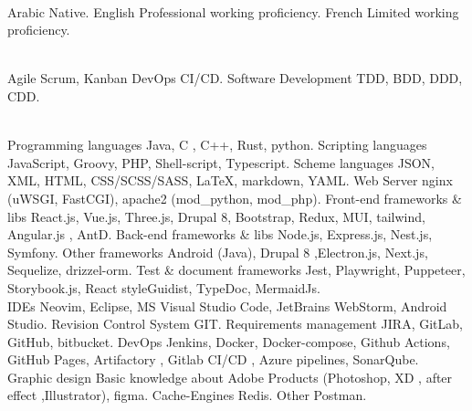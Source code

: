 


\begin{cvskills}
    \\
  \cvskill
    {Arabic}
    {Native.}
  \cvskill
    {English}
    {Professional working proficiency.}
  \cvskill
    {French}
    {Limited working proficiency.}


  \\

  \cvskill
    {Agile}
    {Scrum, Kanban}
  \cvskill
    {DevOps}
    {CI/CD.}
  \cvskill
    {Software Development}
    {TDD, BDD, DDD, CDD.}

  \\

  \cvskill
    {Programming languages}
    {Java, C , C++, Rust, python.}
  \cvskill
    {Scripting languages}
    {JavaScript, Groovy, PHP, Shell-script, Typescript.}
  \cvskill
    {Scheme languages}
    {JSON, XML, HTML, CSS/SCSS/SASS, LaTeX, markdown, YAML.}
  \cvskill
    {Web Server}
    {nginx (uWSGI, FastCGI), apache2 (mod\_python, mod\_php).}
  \cvskill
    {Front-end frameworks \& libs}
    {React.js, Vue.js, Three.js, Drupal 8, Bootstrap, Redux, MUI, tailwind, Angular.js , AntD.}
  \cvskill
    {Back-end frameworks \& libs}
    {Node.js, Express.js, Nest.js, Symfony.}
  \cvskill
    {Other frameworks}
    {Android (Java), Drupal 8 ,Electron.js, Next.js, Sequelize, drizzel-orm.}
  \cvskill
    {Test \& document frameworks}
    {Jest, Playwright, Puppeteer, Storybook.js, React styleGuidist, TypeDoc, MermaidJs.}
  \\

    \cvskill
      {IDEs}
      {Neovim, Eclipse, MS Visual Studio Code, JetBrains WebStorm, Android Studio.}
    \cvskill
      {Revision Control System}
      {GIT.}
    \cvskill
      {Requirements management}
      {JIRA, GitLab, GitHub, bitbucket.}
    \cvskill
      {DevOps}
      {Jenkins, Docker, Docker-compose, Github Actions, GitHub Pages, Artifactory , Gitlab CI/CD , Azure
       \newline pipelines, SonarQube.}
    \cvskill
      {Graphic design}
      {Basic knowledge about Adobe Products (Photoshop, XD , after effect ,Illustrator), figma.}
    \cvskill
      {Cache-Engines}
      {Redis.}
    \cvskill
      {Other}
      {Postman.}


\end{cvskills}
